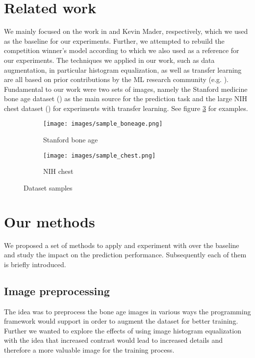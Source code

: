 \documentclass[10pt,twocolumn,letterpaper]{article}
\begin{document}
\section{Related work}
We mainly focused on the work in \cite{kaggleboneage} and Kevin Mader, respectively, which we used as the baseline for our experiments. Further, we attempted to rebuild the competition winner's model according to \cite{16bitrsnachallenge} which we also used as a reference for our experiments. The techniques we applied in our work, such as data augmentation, in particular histogram equalization, as well as transfer learning are all based on prior contributions by the ML research community (e.g. \cite{1411.1792}). \\
Fundamental to our work were two sets of images, namely the Stanford medicine bone age dataset (\cite{stanfordboneage}) as the main source for the prediction task and the large NIH chest dataset (\cite{nihchestxray}) for experiments with transfer learning. See figure \ref{fig:imgdss} for examples.

\begin{figure}[h]
\centering
\begin{subfigure}{0.2\textwidth}
\texttt{[image: images/sample\_boneage.png]} 
\caption{Stanford bone age}
\label{fig:subim1}
\end{subfigure}
\begin{subfigure}{0.2\textwidth}
\texttt{[image: images/sample\_chest.png]}
\caption{NIH chest}
\label{fig:subim2}
\end{subfigure}
\caption{Dataset samples}
\label{fig:imgdss}
\end{figure}


\section{Our methods}
We proposed a set of methods to apply and experiment with over the baseline and study the impact on the prediction performance. Subsequently each of them is briefly introduced.

\subsection{Image preprocessing}
The idea was to preprocess the bone age images in various ways the programming framework would support in order to augment the dataset for better training. Further we wanted to explore the effects of using image histogram equalization with the idea that increased contrast would lead to increased details and therefore a more valuable image for the training process.
\end{document}
